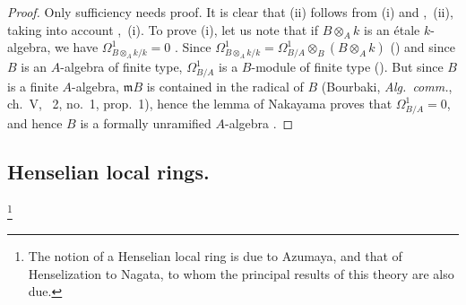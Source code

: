 \begin{proof}
Only sufficiency needs proof.
It is clear that (ii) follows from (i) and ,~(ii), taking into account ,~(i).
To prove (i), let us note that if $B\otimes_A k$ is an \'etale $k$-algebra, we have $\Omega^1_{B\otimes_A k/k}=0$ .
Since $\Omega^1_{B\otimes_A k/k}=\Omega^1_{B/A}\otimes_B(B\otimes_A k)$ () and since $B$ is an $A$-algebra of finite type, $\Omega^1_{B/A}$ is a $B$-module of finite type ().
But since $B$ is a finite $A$-algebra, $\mathfrak{m}B$ is contained in the radical of $B$ (Bourbaki, \emph{Alg.\ comm.}, ch.~V, \textsection~2, no.~1, prop.~1), hence the lemma of Nakayama proves that $\Omega^1_{B/A}=0$, and hence $B$ is a formally unramified $A$-algebra .
\end{proof}


\subsection{Henselian local rings.}
\label{subsection:IV.18.5}
\footnote{The notion of a Henselian local ring is due to Azumaya, and that of Henselization to Nagata, to whom the principal results of this theory are also due.}

